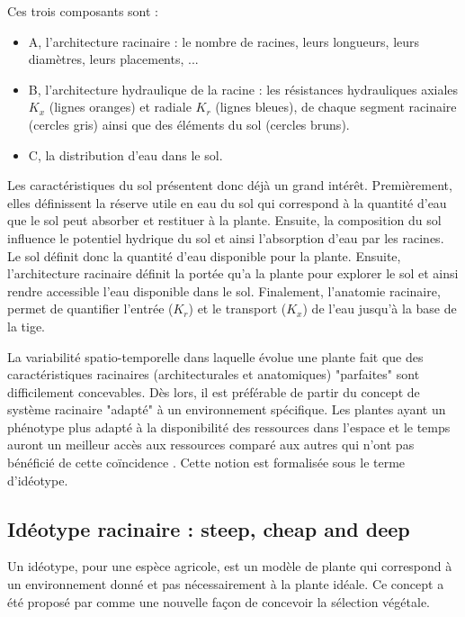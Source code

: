 Ces trois composants sont :

\begin{itemize}
    \item A, l'architecture racinaire : le nombre de racines, leurs longueurs, leurs diamètres, leurs placements, ...
    \item B, l'architecture hydraulique de la racine : les résistances hydrauliques axiales $K_{x}$ (lignes oranges) et radiale $K_{r}$ (lignes bleues), de chaque segment racinaire (cercles gris) ainsi que des éléments du sol (cercles bruns).
    \item C, la distribution d'eau dans le sol.
\end{itemize}

Les caractéristiques du sol présentent donc déjà un grand intérêt.
Premièrement, elles définissent la réserve utile en eau du sol qui correspond à la quantité d’eau que le sol peut absorber et restituer à la plante.
Ensuite, la composition du sol influence le potentiel hydrique du sol et ainsi l'absorption d'eau par les racines.
Le sol définit donc la quantité d'eau disponible pour la plante. 
Ensuite, l'architecture racinaire définit la portée qu'a la plante pour explorer le sol et ainsi rendre accessible l'eau disponible dans le sol.
Finalement, l'anatomie racinaire, permet de quantifier l'entrée ($K_{r}$) et le transport ($K_{x}$) de l'eau jusqu'à la base de la tige.
\newline

La variabilité spatio-temporelle dans laquelle évolue une plante fait que des caractéristiques racinaires (architecturales et anatomiques) "parfaites" sont difficilement concevables.
Dès lors, il est préférable de partir du concept de système racinaire "adapté" à un environnement spécifique.
Les plantes ayant un phénotype plus adapté à la disponibilité des ressources dans l'espace et le temps auront un meilleur accès aux ressources comparé aux autres qui n'ont pas bénéficié de cette coïncidence \citep{lynch_steep_2013}.
Cette notion est formalisée sous le terme d'idéotype.

\subsection{Idéotype racinaire : steep, cheap and deep}

Un idéotype, pour une espèce agricole, est un modèle de plante qui correspond à un environnement donné et pas nécessairement à la plante idéale. 
Ce concept a été proposé par \cite{donald_breeding_1968} comme une nouvelle façon de concevoir la sélection végétale.
\newline 

